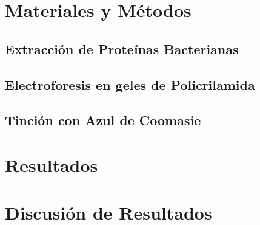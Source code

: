 \documentclass[%
 reprint,
 amsmath,amssymb,
 aps,
showkeys
]{revtex4-1}
\begin{document}
	
\section{\label{sec:MyM}Materiales y Métodos}
	\subsection{\label{sec:ExtraMet}Extracción de Proteínas Bacterianas} 

	\subsection{\label{sec:ElectroMet}Electroforesis en geles de Policrilamida}
	
		\begin{figure}[h]
		\end{figure} 
	
	\subsection{\label{sec:TinMet}Tinción con Azul de Coomasie}
	
	
\section{\label{sec:Resul}Resultados}


\section{\label{sec:Dis}Discusión de Resultados}




\end{document}
